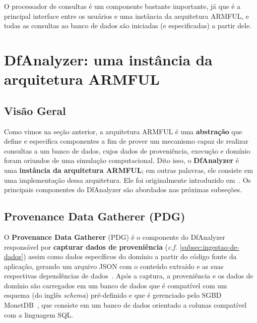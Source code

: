 O processador de consultas é um componente bastante importante, já que é a principal interface entre os usuários e uma instância da arquitetura ARMFUL, e todas as consultas ao banco de dados são iniciadas (e especificadas) a partir dele.

\section{DfAnalyzer: uma instância da arquitetura ARMFUL}%
\label{sec:dfanalyzer-uma-instancia-da-arquitetura-armful}

\subsection{Visão Geral}%
\label{subsec:dfanalyzer-visao-geral}

Como vimos na seção anterior, a arquitetura ARMFUL é uma \textbf{abstração} que define e especifica componentes a fim de prover um mecanismo capaz de realizar consultas a um banco de dados, cujos dados de proveniência, execução e domínio foram oriundos de uma simulação computacional. Dito isso, o \textbf{DfAnalyzer} é uma \textbf{instância da arquitetura ARMFUL}; em outras palavras, ele consiste em uma implementação dessa arquitetura. Ele foi originalmente introduzido em~\cite{silva2016situ}. Os principais componentes do DfAnalyzer são abordados nas próximas subseções.

\subsection{Provenance Data Gatherer (PDG)}

O \textbf{Provenance Data Gatherer} (PDG) é o componente do DfAnalyzer responsável por \textbf{capturar dados de proveniência} (\textit{c.f.} \autoref{subsec:ingestao-de-dados}) assim como dados específicos do domínio a partir do código fonte da aplicação, gerando um arquivo JSON com o conteúdo extraído e as suas respectivas dependências de dados~\cite{silva2016situ}. Após a captura, a proveniência e os dados de domínio são carregados em um banco de dados que é compatível com um esquema (do inglês \textit{schema}) pré-definido e que é gerenciado pelo SGBD MonetDB~\cite{boncz2008breaking}, que consiste em um banco de dados orientado a colunas compatível com a linguagem SQL.

